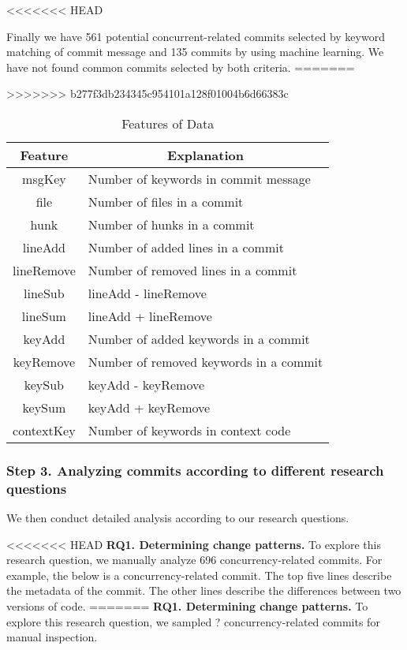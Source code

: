 <<<<<<< HEAD

Finally we have 561 potential concurrent-related commits selected by keyword matching of commit message and 135 commits by using machine learning. We have not found common commits selected by both criteria.
=======

>>>>>>> b277f3db234345c954101a128f01004b6d66383c

\begin{table}
	\centering
	\caption{Features of Data}
	\label{table:feature}
	\begin{tabular}{|c|l|}\hline
		Feature&\multicolumn{1}{|c|}{Explanation}\\\hline
		msgKey&Number of keywords in commit message\\
		file&Number of files in a commit\\
		hunk&Number of hunks in a commit\\
		lineAdd&Number of added lines in a commit\\
		lineRemove&Number of removed lines in a commit\\
		lineSub&lineAdd - lineRemove\\
		lineSum&lineAdd + lineRemove\\
		keyAdd&Number of added keywords in a commit\\
		keyRemove&Number of removed keywords in a commit\\
		keySub&keyAdd - keyRemove\\
		keySum&keyAdd + keyRemove\\
		contextKey&Number of keywords in context code\\\hline
	\end{tabular}
\end{table}

\subsubsection{Step 3. Analyzing commits according to different research questions} We then conduct detailed analysis according to our research questions.

<<<<<<< HEAD
\textbf{RQ1. Determining change patterns.} To explore this research question, we manually analyze 696 concurrency-related commits. For example, the below is a concurrency-related commit. The top five lines describe the metadata of the commit. The other lines describe the differences between two versions of code.
=======
\textbf{RQ1. Determining change patterns.} To explore this research question, we sampled ? concurrency-related commits for manual inspection. 


